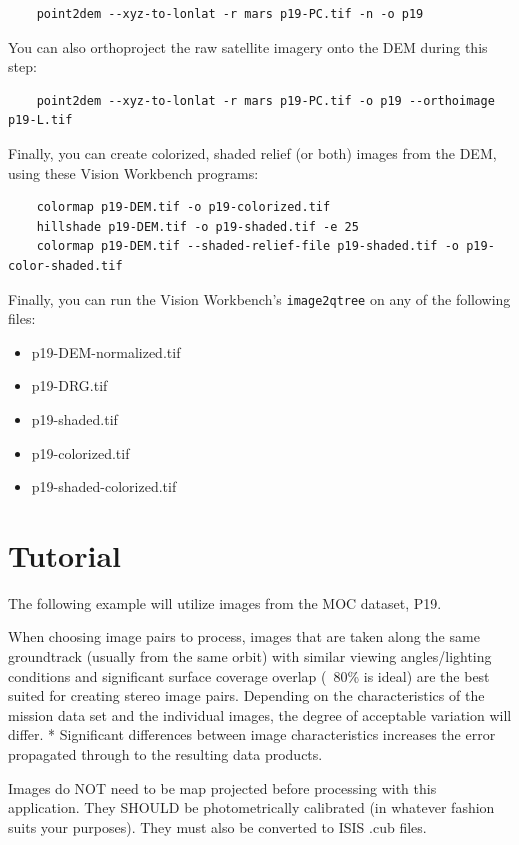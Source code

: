 \begin{verbatim}
	point2dem --xyz-to-lonlat -r mars p19-PC.tif -n -o p19
\end{verbatim}

You can also orthoproject the raw satellite imagery onto the DEM during this step:

\begin{verbatim}
	point2dem --xyz-to-lonlat -r mars p19-PC.tif -o p19 --orthoimage p19-L.tif
\end{verbatim}

Finally, you can create colorized, shaded relief (or both) images from the DEM, using these Vision Workbench programs:

\begin{verbatim}
	colormap p19-DEM.tif -o p19-colorized.tif
	hillshade p19-DEM.tif -o p19-shaded.tif -e 25
	colormap p19-DEM.tif --shaded-relief-file p19-shaded.tif -o p19-color-shaded.tif
\end{verbatim}

Finally, you can run the Vision Workbench's \texttt{image2qtree} on any of the following files:

\begin{itemize}
\item p19-DEM-normalized.tif
\item p19-DRG.tif 
\item p19-shaded.tif
\item p19-colorized.tif
\item p19-shaded-colorized.tif
\end{itemize}


\section{Tutorial}

The following example will utilize images from the MOC dataset, P19.

When choosing image pairs to process, images that are taken along
the same groundtrack (usually from the same orbit) with similar
viewing angles/lighting conditions and significant surface coverage
overlap (~80\% is ideal) are the best suited for creating stereo
image pairs. Depending on the characteristics of the mission data
set and the individual images, the degree of acceptable variation
will differ. * Significant differences between image characteristics
increases the error propagated through to the resulting data products.

Images do NOT need to be map projected before processing with this
application. They SHOULD be photometrically calibrated (in whatever
fashion suits your purposes). They must also be converted to ISIS
.cub files.

